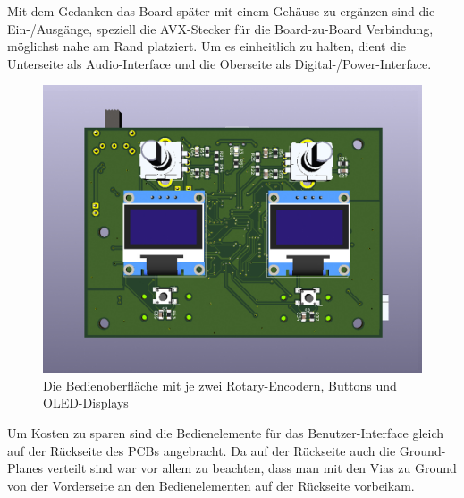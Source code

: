 Mit dem Gedanken das Board später mit einem Gehäuse zu ergänzen sind die Ein-/Ausgänge, speziell die AVX-Stecker für die Board-zu-Board Verbindung, möglichst nahe am Rand platziert. Um es einheitlich zu halten, dient die Unterseite als Audio-Interface und die Oberseite als Digital-/Power-Interface. 

\begin{figure} [H]
\begin{center}
 \includegraphics[scale=0.37]{../graphics/PCB-Layout_GUI.jpg}
 \caption{Die Bedienoberfläche mit je zwei Rotary-Encodern, Buttons und OLED-Displays}
\label{fig:PCB_GUI}
\end{center}
\end{figure}

Um Kosten zu sparen sind die Bedienelemente für das Benutzer-Interface gleich auf der Rückseite des PCBs angebracht. Da auf der Rückseite auch die Ground-Planes verteilt sind war vor allem zu beachten, dass man mit den Vias zu Ground von der Vorderseite an den Bedienelementen auf der Rückseite vorbeikam.